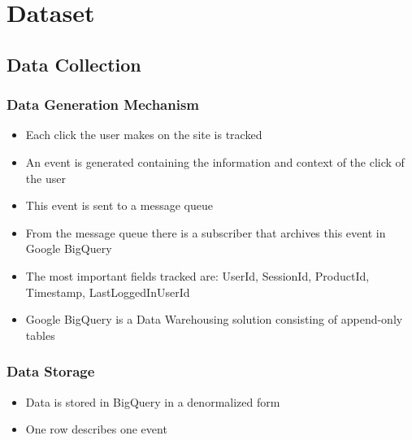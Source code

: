 \chapter{Dataset}

\section{Data Collection}
\subsection{Data Generation Mechanism}
\begin{itemize}
    \item Each click the user makes on the site is tracked
    \item An event is generated containing the information and context of the click of the user
    \item This event is sent to a message queue
    \item From the message queue there is a subscriber that archives this event in Google BigQuery
    \item The most important fields tracked are: UserId, SessionId, ProductId, Timestamp, LastLoggedInUserId
    \item Google BigQuery is a Data Warehousing solution consisting of append-only tables
\end{itemize}
\subsection{Data Storage}
\begin{itemize}
\item Data is stored in BigQuery in a denormalized form
\item One row describes one event
\end{itemize}

